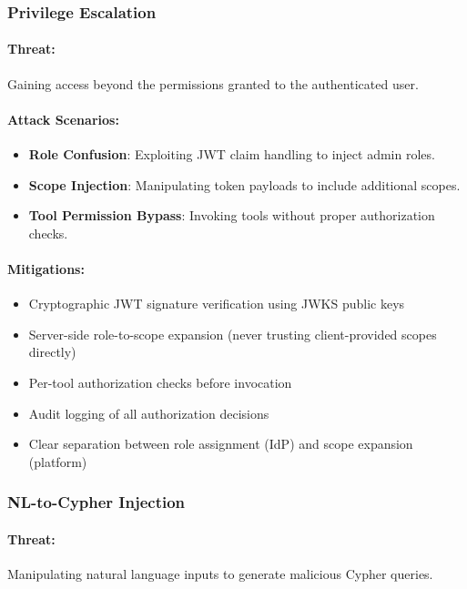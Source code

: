 \subsubsection{Privilege Escalation}

\paragraph{Threat:} Gaining access beyond the permissions granted to the authenticated user.

\paragraph{Attack Scenarios:}
\begin{itemize}
    \item \textbf{Role Confusion}: Exploiting JWT claim handling to inject admin roles.
    \item \textbf{Scope Injection}: Manipulating token payloads to include additional scopes.
    \item \textbf{Tool Permission Bypass}: Invoking tools without proper authorization checks.
\end{itemize}

\paragraph{Mitigations:}
\begin{itemize}
    \item Cryptographic JWT signature verification using JWKS public keys
    \item Server-side role-to-scope expansion (never trusting client-provided scopes directly)
    \item Per-tool authorization checks before invocation
    \item Audit logging of all authorization decisions
    \item Clear separation between role assignment (IdP) and scope expansion (platform)
\end{itemize}

\subsubsection{NL-to-Cypher Injection}

\paragraph{Threat:} Manipulating natural language inputs to generate malicious Cypher queries.

